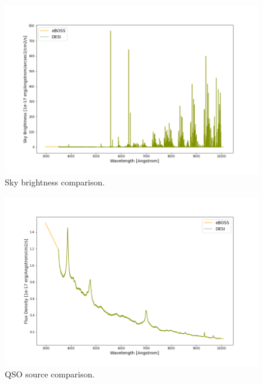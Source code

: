 \begin{figure}[h]
\centering
\includegraphics[width=12cm]{images/specsim/sky_brightness.png}
\caption{Sky brightness comparison.}
\label{fig:sky_brightness}
\end{figure}

\begin{figure}[h]
\centering
\includegraphics[width=12cm]{images/specsim/source.png}
\caption{QSO source comparison.}
\label{fig:qso_source}
\end{figure}

